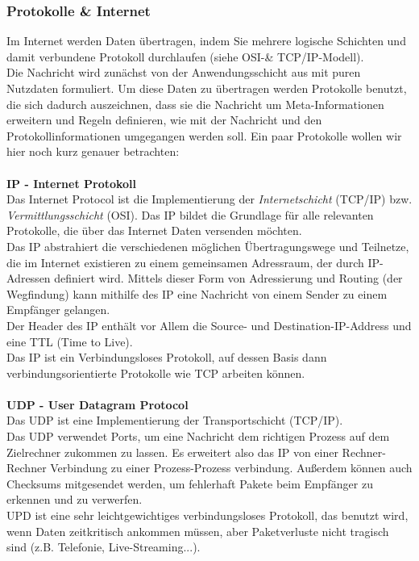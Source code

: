 \subsubsection{Protokolle \& Internet}
Im Internet werden Daten übertragen, indem Sie mehrere logische Schichten und damit verbundene Protokoll durchlaufen (siehe OSI-\& TCP/IP-Modell).\\
Die Nachricht wird zunächst von der Anwendungsschicht aus mit puren Nutzdaten formuliert. Um diese Daten zu übertragen werden Protokolle benutzt, die sich dadurch auszeichnen, dass sie die Nachricht um Meta-Informationen erweitern und Regeln definieren, wie mit der Nachricht und den Protokollinformationen umgegangen werden soll. Ein paar Protokolle wollen wir hier noch kurz genauer betrachten:\\
\\
\textbf{IP - Internet Protokoll}\\
Das Internet Protocol ist die Implementierung der \textit{Internetschicht} (TCP/IP) bzw. \textit{Vermittlungsschicht} (OSI). Das IP bildet die Grundlage für alle relevanten Protokolle, die über das Internet Daten versenden möchten.\\
Das IP abstrahiert die verschiedenen möglichen Übertragungswege und Teilnetze, die im Internet existieren zu einem gemeinsamen Adressraum, der durch IP-Adressen definiert wird. Mittels dieser Form von Adressierung und Routing (der Wegfindung) kann mithilfe des IP eine Nachricht von einem Sender zu einem Empfänger gelangen.\\
Der Header des IP enthält vor Allem die Source- und Destination-IP-Address und eine TTL (Time to Live).\\
Das IP ist ein Verbindungsloses Protokoll, auf dessen Basis dann verbindungsorientierte Protokolle wie TCP arbeiten können.\\
\\
\textbf{UDP - User Datagram Protocol}\\
Das UDP ist eine Implementierung der Transportschicht (TCP/IP).\\
Das UDP verwendet Ports, um eine Nachricht dem richtigen Prozess auf dem Zielrechner zukommen zu lassen. Es erweitert also das IP von einer Rechner-Rechner Verbindung zu einer Prozess-Prozess verbindung. Außerdem können auch Checksums mitgesendet werden, um fehlerhaft Pakete beim Empfänger zu erkennen und zu verwerfen.\\
UPD ist eine sehr leichtgewichtiges verbindungsloses Protokoll, das benutzt wird, wenn Daten zeitkritisch ankommen müssen, aber Paketverluste nicht tragisch sind (z.B. Telefonie, Live-Streaming...).
